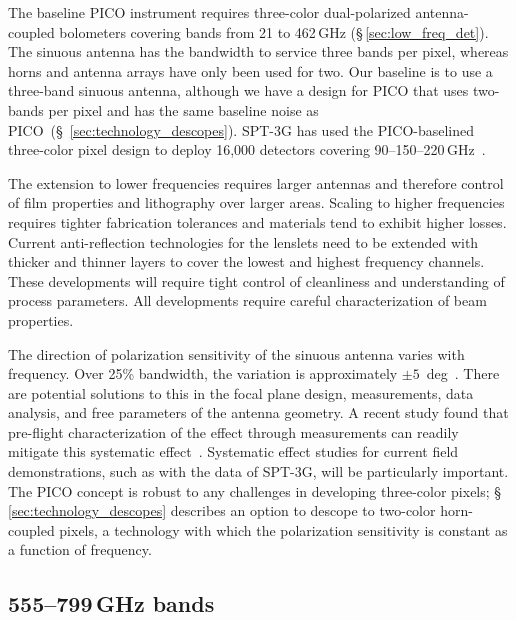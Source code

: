 

The baseline PICO instrument requires three-color dual-polarized antenna-coupled bolometers covering bands from 21 to 462\,GHz
(\S\,\ref{sec:low_freq_det}).  The sinuous antenna has the bandwidth to service three bands per pixel, whereas horns and antenna arrays have only been used for two. Our baseline is to use a three-band sinuous antenna, although we have a design for PICO that uses two-bands per pixel and has the same baseline noise as PICO~(\S~\ref{sec:technology_descopes}). SPT-3G has used the PICO-baselined three-color pixel design to deploy 16,000 detectors covering 90--150--220\,GHz~\citep{Dutcher2018}.


The extension to lower frequencies requires larger antennas and therefore control of film properties and lithography over larger areas. Scaling to higher frequencies requires tighter fabrication tolerances and materials tend to exhibit higher losses. Current anti-reflection technologies for the lenslets need to be extended with thicker and thinner layers to cover the lowest and highest frequency channels. These developments will require tight control of cleanliness and understanding of process parameters. All developments require careful characterization of beam properties.



The direction of polarization sensitivity of the sinuous antenna varies with frequency. Over 25\% bandwidth, the variation is approximately $\pm 5$~deg~\citep{obrient2008b}. 
There are potential solutions to this in the focal plane design, measurements, data analysis, and free parameters of the antenna geometry.  A recent study found that pre-flight characterization of the effect through measurements can readily mitigate this systematic effect~\citep{picoweb_wobble}. Systematic effect studies for current field demonstrations, such as with the data of SPT-3G, will be particularly important. The PICO concept is robust to any challenges in developing three-color pixels; 
%
%
%
%
%
\S\,\ref{sec:technology_descopes} describes an option to descope to two-color horn-coupled pixels, 
a technology with which the polarization sensitivity is constant as a function of frequency.

\subsection{555--799\,GHz bands}
\label{sec:dev_arrays}


